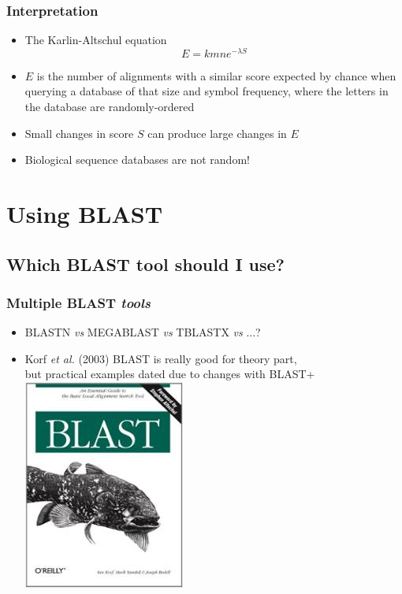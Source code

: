 \documentclass[table]{beamer}
\begin{document}
    \begin{frame}
     \frametitle{Interpretation}
     \begin{itemize}
       \item The Karlin-Altschul equation
       \begin{equation*}
         E = k m n e^{-\lambda S}
       \end{equation*}
       \item $E$ is the number of alignments with a similar score expected by chance when querying a database of that size and symbol frequency, where the letters in the database are randomly-ordered
       \item Small changes in score $S$ can produce large changes in $E$
       \item Biological sequence databases are not random!
     \end{itemize}
    \end{frame} 

  
  \section{Using BLAST}
    \subsection{Which BLAST tool should I use?}

    \begin{frame}
     \frametitle{Multiple BLAST \textit{tools}}
     \begin{itemize}
         \item BLASTN \textit{vs} MEGABLAST \textit{vs} TBLASTX \textit{vs} ...?
         \item Korf \textit{et al.} (2003) BLAST is really good for theory part, \\
         but practical examples dated due to changes with BLAST+
     \includegraphics[width=.2\textwidth]{images/korf_book}
     \end{itemize}
    \end{frame}
\end{document}
